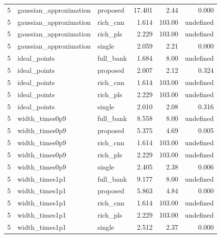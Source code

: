 \documentclass[10pt,a4paper]{article}
\begin{document}
\begin{landscape}
\begin{longtable}{lllrrr}
5 & gaussian\_approximation & proposed & 17.401 & 2.44 & 0.000 \\
5 & gaussian\_approximation & rich\_cnn & 1.614 & 103.00 & undefined \\
5 & gaussian\_approximation & rich\_pls & 2.229 & 103.00 & undefined \\
5 & gaussian\_approximation & single & 2.059 & 2.21 & 0.000 \\
5 & ideal\_points & full\_bank & 1.684 & 8.00 & undefined \\
5 & ideal\_points & proposed & 2.007 & 2.12 & 0.324 \\
5 & ideal\_points & rich\_cnn & 1.614 & 103.00 & undefined \\
5 & ideal\_points & rich\_pls & 2.229 & 103.00 & undefined \\
5 & ideal\_points & single & 2.010 & 2.08 & 0.316 \\
5 & width\_times0p9 & full\_bank & 8.558 & 8.00 & undefined \\
5 & width\_times0p9 & proposed & 5.375 & 4.69 & 0.005 \\
5 & width\_times0p9 & rich\_cnn & 1.614 & 103.00 & undefined \\
5 & width\_times0p9 & rich\_pls & 2.229 & 103.00 & undefined \\
5 & width\_times0p9 & single & 2.405 & 2.38 & 0.006 \\
5 & width\_times1p1 & full\_bank & 9.177 & 8.00 & undefined \\
5 & width\_times1p1 & proposed & 5.863 & 4.84 & 0.000 \\
5 & width\_times1p1 & rich\_cnn & 1.614 & 103.00 & undefined \\
5 & width\_times1p1 & rich\_pls & 2.229 & 103.00 & undefined \\
5 & width\_times1p1 & single & 2.512 & 2.37 & 0.000 \\
\bottomrule
\end{longtable}
\normalsize\end{landscape}
\end{document}
